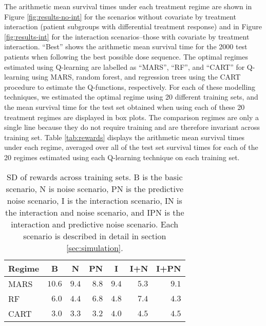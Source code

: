 \documentclass[12pt]{article}
\begin{document}
The arithmetic mean survival times under each treatment regime are shown in Figure \ref{fig:results-no-int} for the scenarios without covariate by treatment interaction (patient subgroups with differential treatment response) and in Figure \ref{fig:results-int} for the interaction scenarios--those with covariate by treatment interaction. ``Best'' shows the arithmetic mean survival time for the 2000 test patients when following the best possible dose sequence. The optimal regimes estimated using Q-learning are labelled as ``MARS'', ``RF'', and ``CART'' for Q-learning using MARS, random forest, and regression trees using the CART procedure to estimate the Q-functions, respectively. For each of these modelling techniques, we estimated the optimal regime using 20 different training sets, and the mean survival time for the test set obtained when using each of these 20 treatment regimes are displayed in box plots. The comparison regimes are only a single line because they do not require training and are therefore invariant across training set. Table \ref{tab:rewards} displays the arithmetic mean survival times under each regime, averaged over all of the test set survival times for each of the 20 regimes estimated using each Q-learning technique on each training set. 

\begin{table}[!htbp]
\caption[SD of rewards across training sets]{SD of rewards across training sets. B is the basic scenario, N is noise scenario, PN is the predictive noise scenario, I is the interaction scenario, IN is the interaction and noise scenario, and IPN is the interaction and predictive noise scenario. Each scenario is described in detail in section \ref{sec:simulation}. \label{tab:sd-train-rewards}} 
\begin{center}
\begin{tabular}{lrrrrrr}
\toprule
\multicolumn{1}{c}{Regime}&\multicolumn{1}{c}{B}&\multicolumn{1}{c}{N}&\multicolumn{1}{c}{PN}&\multicolumn{1}{c}{I}&\multicolumn{1}{c}{I+N}&\multicolumn{1}{c}{I+PN}\tabularnewline
\midrule
MARS&$10.6$&$9.4$&$8.8$&$9.4$&$5.3$&$9.1$\tabularnewline
RF&$ 6.0$&$4.4$&$6.8$&$4.8$&$7.4$&$4.3$\tabularnewline
CART&$ 3.0$&$3.3$&$3.2$&$4.0$&$4.5$&$4.5$\tabularnewline
\bottomrule
\end{tabular}\end{center}
\end{table}
\end{document}
